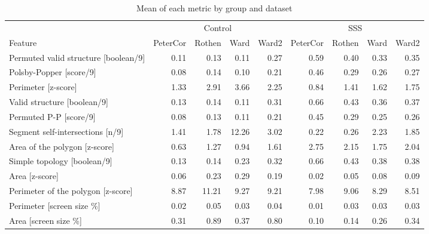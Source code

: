 \documentclass[
  man,
  floatsintext,
  longtable,
  nolmodern,
  notxfonts,
  notimes,
  colorlinks=true,linkcolor=blue,citecolor=blue,urlcolor=blue]{apa7}
\begin{document}
\begin{table}

{\caption{{Mean of each metric by group and dataset}{\label{tbl-apx02}}}
\vspace{-20pt}}

\fontsize{12.0pt}{14.0pt}\selectfont
\begin{tabular*}{\linewidth}{@{\extracolsep{\fill}}>{\raggedright\arraybackslash}p{\dimexpr 112.50pt -2\tabcolsep-1.5\arrayrulewidth}rrrrrrrr}
\toprule
 & \multicolumn{4}{c}{{Control}} & \multicolumn{4}{c}{{SSS}} \\ 
\cmidrule(lr){2-5} \cmidrule(lr){6-9}
Feature & PeterCor & Rothen & Ward & Ward2 & PeterCor & Rothen & Ward & Ward2 \\ 
\midrule\addlinespace[2.5pt]
Permuted valid structure [boolean/9] & 0.11 &  0.13 &  0.11 & 0.27 & 0.59 & 0.40 & 0.33 & 0.35 \\ 
Polsby-Popper [score/9] & 0.08 &  0.14 &  0.10 & 0.21 & 0.46 & 0.29 & 0.26 & 0.27 \\ 
Perimeter [z-score] & 1.33 &  2.91 &  3.66 & 2.25 & 0.84 & 1.41 & 1.62 & 1.75 \\ 
Valid structure [boolean/9] & 0.13 &  0.14 &  0.11 & 0.31 & 0.66 & 0.43 & 0.36 & 0.37 \\ 
Permuted P-P [score/9] & 0.08 &  0.13 &  0.11 & 0.21 & 0.45 & 0.29 & 0.25 & 0.26 \\ 
Segment self-intersections [n/9] & 1.41 &  1.78 & 12.26 & 3.02 & 0.22 & 0.26 & 2.23 & 1.85 \\ 
Area of the polygon [z-score] & 0.63 &  1.27 &  0.94 & 1.61 & 2.75 & 2.15 & 1.75 & 2.04 \\ 
Simple topology [boolean/9] & 0.13 &  0.14 &  0.23 & 0.32 & 0.66 & 0.43 & 0.38 & 0.38 \\ 
Area [z-score] & 0.06 &  0.23 &  0.29 & 0.19 & 0.02 & 0.05 & 0.08 & 0.09 \\ 
Perimeter of the polygon [z-score] & 8.87 & 11.21 &  9.27 & 9.21 & 7.98 & 9.06 & 8.29 & 8.51 \\ 
Perimeter [screen size \%] & 0.02 &  0.05 &  0.03 & 0.04 & 0.01 & 0.03 & 0.03 & 0.03 \\ 
Area [screen size \%] & 0.31 &  0.89 &  0.37 & 0.80 & 0.10 & 0.14 & 0.26 & 0.34 \\ 
\bottomrule
\end{tabular*}

\end{table}
\end{document}
